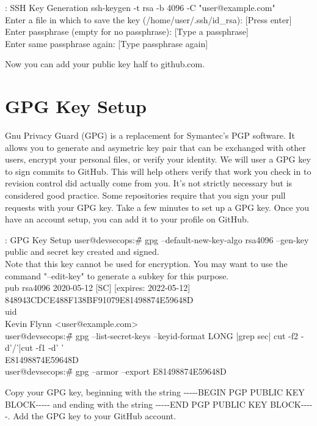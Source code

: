 \begin{mybox}{\thetcbcounter: SSH Key Generation}
	ssh-keygen -t rsa -b 4096 -C "user@example.com"\\
	Enter a file in which to save the key (/home/user/.ssh/id\_rsa): [Press enter]\\
	Enter passphrase (empty for no passphrase): [Type a passphrase]\\
	Enter same passphrase again: [Type passphrase again]
\end{mybox}

\justify
Now you can add your public key half to github.com.

\section{GPG Key Setup}
\justify
Gnu Privacy Guard (GPG) is a replacement for Symantec's PGP software. It allows you
to generate and asymetric key pair that can be exchanged with other users, encrypt your
personal files, or verify your identity. 
\justify
We will user a GPG key to sign commits
to GitHub. This will help others verify that work you check in to revision control did 
actually come from you. It's not strictly necessary but is considered good practice.
Some repositories require that you sign your pull requests with your GPG key.
\justify
Take a few minutes to set up a GPG key. Once you have an account setup, you can add
it to your profile on GitHub.

\begin{mybox}{\thetcbcounter: GPG Key Setup}
	user@devsecops:\~\# gpg --default-new-key-algo rsa4096 --gen-key\\
	public and secret key created and signed.\\
	Note that this key cannot be used for encryption.  You may want to use
	the command "--edit-key" to generate a subkey for this purpose.\\
	pub   rsa4096 2020-05-12 [SC] [expires: 2022-05-12]\\
	\hspace*{15mm}      848943CDCE488F138BF91079E81498874E59648D\\
	uid\\
	\hspace*{25mm}                     Kevin Flynn <user@example.com>\\
	
	user@devsecops:\~\# gpg --list-secret-keys --keyid-format LONG |grep sec| cut -f2 -d'/'|cut -f1 -d' '\\
	E81498874E59648D\\
	user@devsecops:\~\# gpg --armor --export E81498874E59648D
\end{mybox}
\justify
Copy your GPG key, beginning with the string
-\/-\/-\/-\/-BEGIN PGP PUBLIC KEY BLOCK-\/-\/-\/-\/- and ending with the string
-\/-\/-\/-\/-END PGP PUBLIC KEY BLOCK-\/-\/-\/-\/-. Add the GPG key to
your GitHub account.

